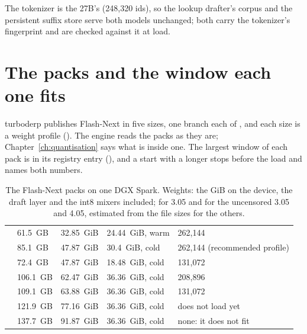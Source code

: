 The tokenizer is the 27B's (248,320 ids), so the lookup drafter's corpus and the persistent suffix store serve both models unchanged; both carry the tokenizer's fingerprint and are checked against it at load.

\section{The packs and the window each one fits}\label{sec:fn-packs}

turboderp publishes Flash-Next in five sizes, one branch each of , and each size is a weight profile (). The engine reads the packs as they are; Chapter~\ref{ch:quantisation} says what is inside one. The largest window of each pack is in its registry entry (), and a start with a longer  stops before the load and names both numbers.

\begin{table}[htbp]
\centering\small
\caption[The Flash-Next packs]{The Flash-Next packs on one DGX Spark. Weights: the GiB on the device, the draft layer and the int8 mixers included; \measured{} for 3.05 and for the uncensored 3.05 and 4.05, estimated from the file sizes for the others.}\label{tab:fn-packs}
\begin{tabularx}{\linewidth}{@{}L{.17\linewidth}L{.1\linewidth}L{.13\linewidth}L{.18\linewidth}Y@{}}
\toprule
{} &  &  &  &  \\
\midrule
{} & 61.5~GB & 32.85~GiB & 24.44~GiB, warm & 262,144 \\
 & 85.1~GB & 47.87~GiB & 30.4~GiB, cold & 262,144 (recommended profile) \\
 & 72.4~GB & 47.87~GiB & 18.48~GiB, cold & 131,072 \\
 & 106.1~GB & 62.47~GiB & 36.36~GiB, cold & 208,896 \\
 & 109.1~GB & 63.88~GiB & 36.36~GiB, cold & 131,072 \\
 & 121.9~GB & 77.16~GiB & 36.36~GiB, cold & does not load yet \\
 & 137.7~GB & 91.87~GiB & 36.36~GiB, cold & none: it does not fit \\
\bottomrule
\end{tabularx}
\end{table}

